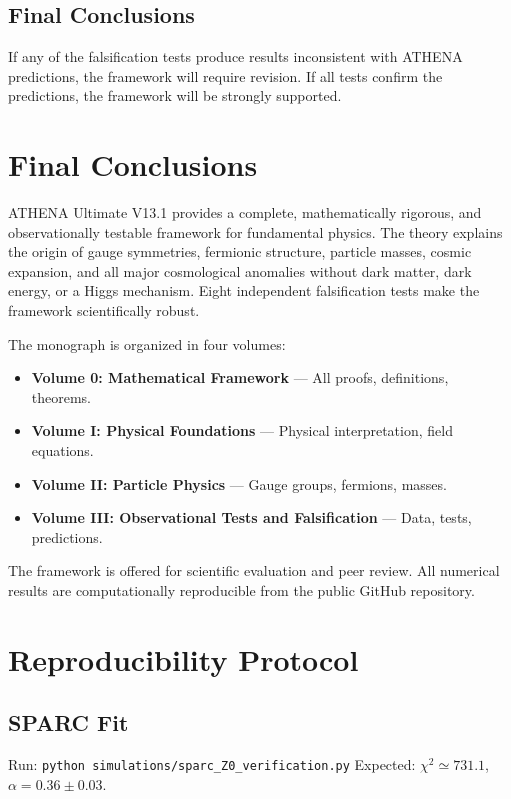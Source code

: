 \documentclass[12pt,oneside]{book}
\begin{document}
\section{Final Conclusions}

If any of the falsification tests produce results inconsistent with ATHENA predictions, the framework will require revision. If all tests confirm the predictions, the framework will be strongly supported.

\chapter*{Final Conclusions}

ATHENA Ultimate V13.1 provides a complete, mathematically rigorous, and observationally testable framework for fundamental physics. The theory explains the origin of gauge symmetries, fermionic structure, particle masses, cosmic expansion, and all major cosmological anomalies without dark matter, dark energy, or a Higgs mechanism. Eight independent falsification tests make the framework scientifically robust.

The monograph is organized in four volumes:
\begin{itemize}
    \item \textbf{Volume 0: Mathematical Framework} — All proofs, definitions, theorems.
    \item \textbf{Volume I: Physical Foundations} — Physical interpretation, field equations.
    \item \textbf{Volume II: Particle Physics} — Gauge groups, fermions, masses.
    \item \textbf{Volume III: Observational Tests and Falsification} — Data, tests, predictions.
\end{itemize}

The framework is offered for scientific evaluation and peer review. All numerical results are computationally reproducible from the public GitHub repository.

\appendix
\chapter{Reproducibility Protocol}

\section{SPARC Fit}
Run: \texttt{python simulations/sparc\_Z0\_verification.py}
Expected: $\chi^2 \simeq 731.1$, $\alpha = 0.36 \pm 0.03$.
\end{document}
